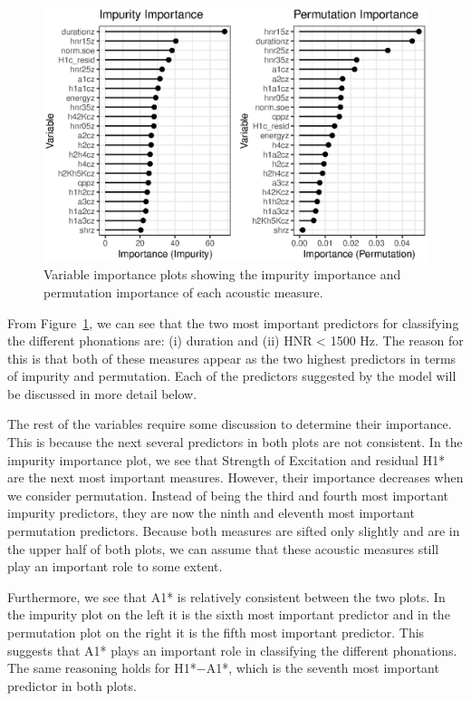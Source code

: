 \begin{figure}[h!]
    \centering
    \includegraphics[width = \linewidth]{images/RandomForest/rf_dur_plots.eps}
    \caption{Variable importance plots showing the impurity importance and permutation importance of each acoustic measure.}
    \label{fig:predictor_importance}
\end{figure}

From Figure~\ref{fig:predictor_importance}, we can see that the two most important predictors for classifying the different phonations are: (i) duration and (ii) HNR < 1500 Hz. The reason for this is that both of these measures appear as the two highest predictors in terms of impurity and permutation. Each of the predictors suggested by the model will be discussed in more detail below. 

The rest of the variables require some discussion to determine their importance. This is because the next several predictors in both plots are not consistent. In the impurity importance plot, we see that Strength of Excitation and residual H1* are the next most important measures. However, their importance decreases when we consider permutation. Instead of being the third and fourth most important impurity predictors, they are now the ninth and eleventh most important permutation predictors. Because both measures are sifted only slightly and are in the upper half of both plots, we can assume that these acoustic measures still play an important role to some extent.

Furthermore, we see that A1* is relatively consistent between the two plots. In the impurity plot on the left it is the sixth most important predictor and in the permutation plot on the right it is the fifth most important predictor. This suggests that A1* plays an important role in classifying the different phonations. The same reasoning holds for H1*$-$A1*, which is the seventh most important predictor in both plots. 


